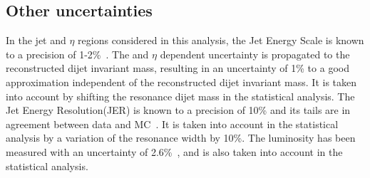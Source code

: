 \subsection{Other uncertainties}

In the jet \pt and $\eta$ regions considered in this analysis, the Jet Energy Scale is known to a precision of 1-2\%~\cite{JME-JINST,Collaboration:2013dp}.
The \pt and $\eta$ dependent uncertainty is propagated to the reconstructed dijet invariant mass, resulting in an uncertainty of 1\% to a good approximation independent of the reconstructed dijet invariant mass.
It is taken into account by shifting the resonance dijet mass in the statistical analysis.
The Jet Energy Resolution(JER) is known to a precision of 10\% and its tails are in agreement between data and MC~\cite{JME-JINST}.
It is taken into account in the statistical analysis by a variation of the resonance width by 10\%.
The luminosity has been measured with an uncertainty of 2.6\%~\cite{LUM-13-001}, and is also taken into account in the statistical analysis.

\clearpage
